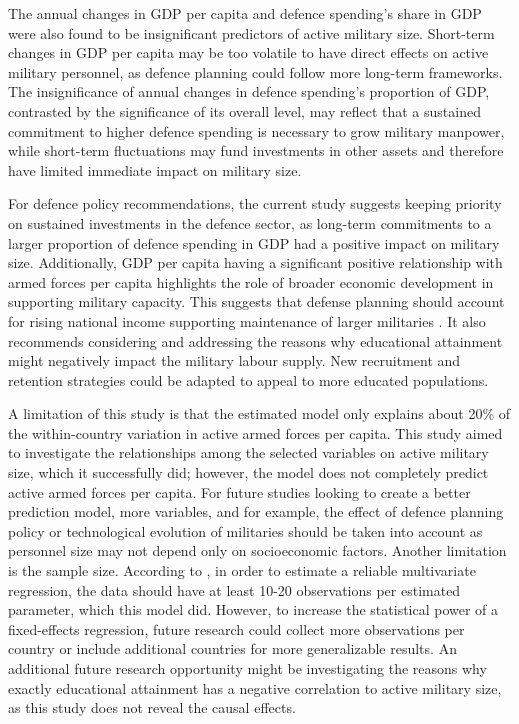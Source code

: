 The annual changes in GDP per capita and defence spending's share in GDP were also found to be 
insignificant predictors of active military size. Short-term changes in GDP per capita may be 
too volatile to have direct effects on active military personnel, as defence planning could 
follow more long-term frameworks. The insignificance of annual changes in defence spending's 
proportion of GDP, contrasted by the significance of its overall level, may 
reflect that a sustained commitment to higher defence spending is 
necessary to grow military manpower, while short-term fluctuations may fund
investments in other assets and therefore have limited immediate impact on military size.

For defence policy recommendations, the current study suggests keeping priority on sustained 
investments in the defence sector, as long-term commitments to a larger proportion of defence 
spending in GDP had a positive impact on military size. 
Additionally, GDP per capita having a significant positive relationship 
with armed forces per capita highlights the role of broader economic development in 
supporting military capacity. This suggests that defense planning should account for 
rising national income supporting maintenance of larger militaries .
It also recommends considering and 
addressing the reasons why educational attainment might negatively impact the military labour supply. 
New recruitment and retention strategies could be adapted to appeal to more educated 
populations.

A limitation of this study is that the estimated model only explains about 20\% of the within-country 
variation in active armed forces per capita. 
This study aimed to investigate the relationships among the selected variables on 
active military size, which it successfully did; however, the model does not completely predict 
active armed forces per capita. For future studies looking to create a better prediction model, 
more variables, and for example, the effect of defence planning policy or technological evolution of militaries 
should be taken into account as 
personnel size may not depend only on socioeconomic factors.
Another limitation is the sample size. According to \textcite{harrell_multivariable_2015},
in order to estimate a reliable multivariate regression, the data should have at least 
10-20 observations per estimated parameter, which this model did. 
However, to increase the statistical 
power of a fixed-effects regression, 
future research could collect more observations per country or 
include additional countries for more generalizable results.
An additional future research opportunity might be investigating the reasons why exactly educational 
attainment has a negative correlation to active military size, as this study does not reveal 
the causal effects.

